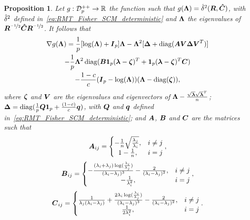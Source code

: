 \documentclass{article}
\theoremstyle{plain}
\newtheorem{proposition}[theorem]{Proposition}
\theoremstyle{definition}
\theoremstyle{remark}
\begin{document}
\begin{proposition}
\label{prop:RMT_Fisher_SCM_deterministic_grad}
    Let $g:\mathcal{D}^{++}_{p}\to\mathbb{R}$ the function such that $g(\boldsymbol{\Lambda})=\hat{\delta}^2(\boldsymbol{R},\boldsymbol{\hat{C}})$, with $\hat{\delta}^2$ defined in~\eqref{eq:RMT_Fisher_SCM_deterministic} and $\boldsymbol{\Lambda}$ the eigenvalues of $\boldsymbol{R}^{\nicefrac{-1}{2}}\boldsymbol{\hat{C}}\boldsymbol{R}^{\nicefrac{-1}{2}}$.
    It follows that
    \begin{multline*}
        \nabla g(\boldsymbol{\Lambda}) = \frac1{p}[\log(\boldsymbol{\Lambda})+\boldsymbol{I}_{p}]\boldsymbol{\Lambda}
        - \boldsymbol{\Lambda}^2[\boldsymbol{\Delta} + \operatorname{diag}(\boldsymbol{A}\boldsymbol{V}\boldsymbol{\Delta}\boldsymbol{V}^T)]
        \\
        - \frac1{p}\boldsymbol{\Lambda}^2\operatorname{diag}(\boldsymbol{B}\boldsymbol{1}_{p}(\boldsymbol{\lambda}-\boldsymbol{\zeta})^T + \boldsymbol{1}_{p}(\boldsymbol{\lambda}-\boldsymbol{\zeta})^T\boldsymbol{C})
        \\
        -\frac{1-c}{c}(\boldsymbol{I}_{p}-\log(\boldsymbol{\Lambda}))(\boldsymbol{\Lambda}-\operatorname{diag}(\boldsymbol{\zeta})),
    \end{multline*}
    where $\boldsymbol{\zeta}$ and $\boldsymbol{V}$ are the eigenvalues and eigenvectors of $\boldsymbol{\Lambda}-\frac{\sqrt{\boldsymbol{\lambda}}\sqrt{\boldsymbol{\lambda}}^T}{n}$; $\boldsymbol{\Delta}=\operatorname{diag}(\frac1{p}\boldsymbol{Q}\boldsymbol{1}_{p}+\frac{(1-c)}{c}\boldsymbol{q})$, with $\boldsymbol{Q}$ and $\boldsymbol{q}$ defined in~\eqref{eq:RMT_Fisher_SCM_deterministic}; and $\boldsymbol{A}$, $\boldsymbol{B}$ and $\boldsymbol{C}$ are the matrices such that
    \begin{equation*}
        \boldsymbol{A}_{ij} = \left\{ 
        \begin{matrix}
            -\frac1{n}\sqrt{\frac{\lambda_j}{\lambda_i}}, & i\neq j
            \\
            1-\frac1{n}, & i=j
        \end{matrix}
        \right.,
    \end{equation*}
    \begin{equation*}
        \boldsymbol{B}_{ij} = \left\{ 
        \begin{matrix}
            -\frac{(\lambda_i+\lambda_j)\log(\frac{\lambda_i}{\lambda_j})}{(\lambda_i-\lambda_j)^3} - \frac{2}{(\lambda_i-\lambda_j)^2}, & i\neq j
            \\
            -\frac1{\lambda_i^2}, & i=j
        \end{matrix}
        \right.,
    \end{equation*}
    \begin{equation*}
        \boldsymbol{C}_{ij} = \left\{ 
        \begin{matrix}
            \frac{1}{\lambda_j(\lambda_i-\lambda_j)} + \frac{2\lambda_i\log(\frac{\lambda_i}{\lambda_j})}{(\lambda_i-\lambda_j)^3} - \frac{2}{(\lambda_i-\lambda_j)^2}, & i\neq j
            \\
            \frac1{2\lambda_i^2}, & i=j
        \end{matrix}
        \right..
    \end{equation*}
\end{proposition}
\end{document}
